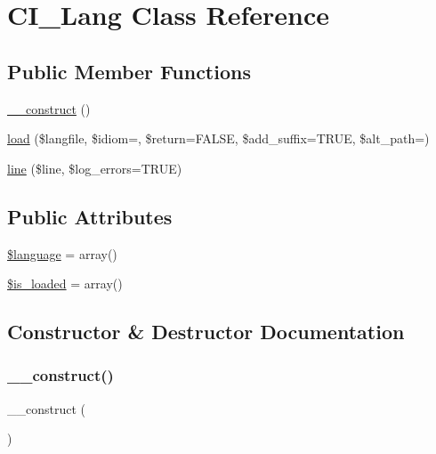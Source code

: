 \hypertarget{class_c_i___lang}{}\section{C\+I\+\_\+\+Lang Class Reference}
\label{class_c_i___lang}
\subsection*{Public Member Functions}
\begin{DoxyCompactItemize}
\item 
\mbox{\hyperlink{class_c_i___lang_a095c5d389db211932136b53f25f39685}{\+\_\+\+\_\+construct}} ()
\item 
\mbox{\hyperlink{class_c_i___lang_a38b49b0297816c583824cefbc30d0217}{load}} (\$langfile, \$idiom=\textquotesingle{}\textquotesingle{}, \$return=F\+A\+L\+SE, \$add\+\_\+suffix=T\+R\+UE, \$alt\+\_\+path=\textquotesingle{}\textquotesingle{})
\item 
\mbox{\hyperlink{class_c_i___lang_a60a06468111224f49dd5cd51e5dc1410}{line}} (\$line, \$log\+\_\+errors=T\+R\+UE)
\end{DoxyCompactItemize}
\subsection*{Public Attributes}
\begin{DoxyCompactItemize}
\item 
\mbox{\hyperlink{class_c_i___lang_a83170d318260a5a2e2a79dccdd371b10}{\$language}} = array()
\item 
\mbox{\hyperlink{class_c_i___lang_a908e9ad52a5d1956d360689452f6bdbe}{\$is\+\_\+loaded}} = array()
\end{DoxyCompactItemize}


\subsection{Constructor \& Destructor Documentation}
\mbox{\label{class_c_i___lang_a095c5d389db211932136b53f25f39685}} 
\subsubsection{\texorpdfstring{\+\_\+\+\_\+construct()}{\_\_construct()}}
{\footnotesize\ttfamily \+\_\+\+\_\+construct (\begin{DoxyParamCaption}{ }\end{DoxyParamCaption})}

